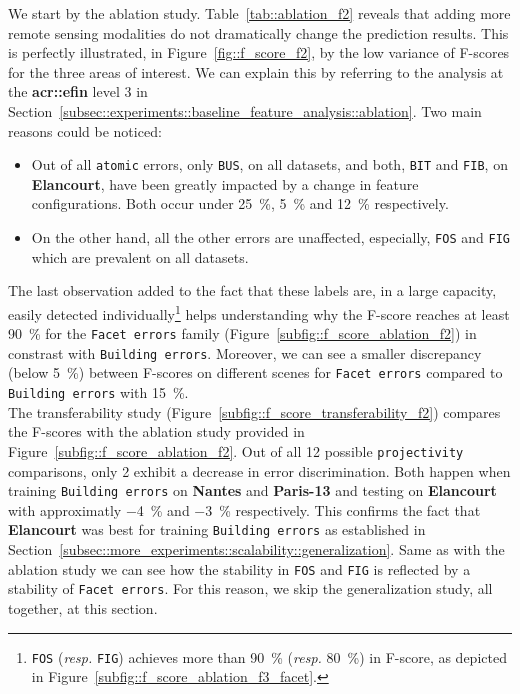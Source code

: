         We start by the ablation study.
        Table~\ref{tab::ablation_f2} reveals that adding more remote sensing modalities do not dramatically change the prediction results.
        This is perfectly illustrated, in Figure~\ref{fig::f_score_f2}, by the low variance of F-scores for the three areas of interest.
        We can explain this by referring to the analysis at the \textbf{\gls{acr::efin}} level 3 in Section~\ref{subsec::experiments::baseline_feature_analysis::ablation}.
        Two main reasons could be noticed:
        \begin{itemize}[label=\(\blacktriangleright\)]
            \item Out of all \texttt{atomic} errors, only \texttt{BUS}, on all datasets, and both, \texttt{BIT} and \texttt{FIB}, on \textbf{Elancourt}, have been greatly impacted by a change in feature configurations.
                    Both occur under \SI{25}{\percent}, \SI{5}{\percent} and \SI{12}{\percent} respectively.
            \item On the other hand, all the other errors are unaffected, especially, \texttt{FOS} and \texttt{FIG} which are prevalent on all datasets.
        \end{itemize}
        The last observation added to the fact that these labels are, in a large capacity, easily detected individually\footnote{
            \texttt{FOS} (\textit{resp.} \texttt{FIG}) achieves more than \SI{90}{\percent} (\textit{resp.} \SI{80}{\percent}) in F-score, as depicted in Figure~\ref{subfig::f_score_ablation_f3_facet}.
        } helps understanding why the F-score reaches at least \SI{90}{\percent} for the \texttt{Facet errors} family (Figure~\ref{subfig::f_score_ablation_f2}) in constrast with \texttt{Building errors}.
        Moreover, we can see a smaller discrepancy (below \SI{5}{\percent}) between F-scores on different scenes for \texttt{Facet errors} compared to \texttt{Building errors} with \SI{15}{\percent}.\\

        The transferability study (Figure~\ref{subfig::f_score_transferability_f2}) compares the F-scores with the ablation study provided in Figure~\ref{subfig::f_score_ablation_f2}.
        Out of all 12 possible \texttt{projectivity} comparisons, only 2 exhibit a decrease in error discrimination.
        Both happen when training \texttt{Building errors} on \textbf{Nantes} and \textbf{Paris-13} and testing on \textbf{Elancourt} with approximatly \SI{-4}{\percent} and \SI{-3}{\percent} respectively.
        This confirms the fact that \textbf{Elancourt} was best for training \texttt{Building errors} as established in Section~\ref{subsec::more_experiments::scalability::generalization}.
        Same as with the ablation study we can see how the stability in \texttt{FOS} and \texttt{FIG} is reflected by a stability of \texttt{Facet errors}.
        For this reason, we skip the generalization study, all together, at this section.\\

